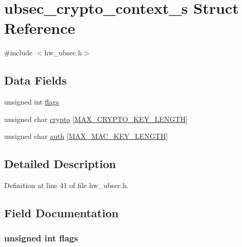\hypertarget{structubsec__crypto__context__s}{}\section{ubsec\+\_\+crypto\+\_\+context\+\_\+s Struct Reference}
\label{structubsec__crypto__context__s}


{\ttfamily \#include $<$hw\+\_\+ubsec.\+h$>$}

\subsection*{Data Fields}
\begin{DoxyCompactItemize}
\item 
unsigned int \hyperlink{structubsec__crypto__context__s_ac92588540e8c1d014a08cd8a45462b19}{flags}
\item 
unsigned char \hyperlink{structubsec__crypto__context__s_a7514477f6197b993ddb6491aec0827cc}{crypto} \mbox{[}\hyperlink{hw__ubsec_8h_ad32decc8e38de032bd2735158db256e2}{M\+A\+X\+\_\+\+C\+R\+Y\+P\+T\+O\+\_\+\+K\+E\+Y\+\_\+\+L\+E\+N\+G\+TH}\mbox{]}
\item 
unsigned char \hyperlink{structubsec__crypto__context__s_ad2321ae6195e63508d9bbc38ec20c7c6}{auth} \mbox{[}\hyperlink{hw__ubsec_8h_ab71ebad37aa50ae552f3b326911c48fb}{M\+A\+X\+\_\+\+M\+A\+C\+\_\+\+K\+E\+Y\+\_\+\+L\+E\+N\+G\+TH}\mbox{]}
\end{DoxyCompactItemize}


\subsection{Detailed Description}


Definition at line 41 of file hw\+\_\+ubsec.\+h.



\subsection{Field Documentation}
\subsubsection[{\texorpdfstring{flags}{flags}}]{\setlength{\rightskip}{0pt plus 5cm}unsigned int flags}\hypertarget{structubsec__crypto__context__s_ac92588540e8c1d014a08cd8a45462b19}{}\label{structubsec__crypto__context__s_ac92588540e8c1d014a08cd8a45462b19}


